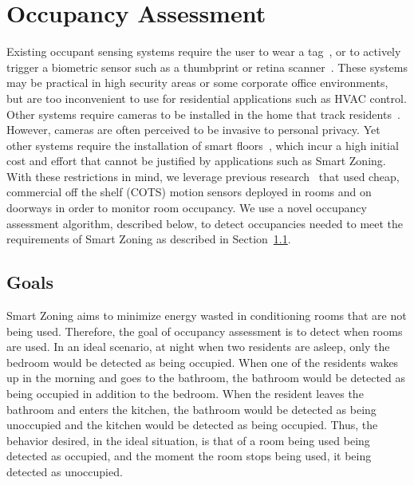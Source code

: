 \chapter{Occupancy Assessment}
\label{sec:occupancyAssessment}
Existing occupant sensing systems require the user to wear a
tag~\cite{smith2005rfid}, or to actively trigger a biometric sensor such as a
thumbprint or retina scanner~\cite{smith2005exploring}. These systems may be
practical in high security areas or some corporate office environments, but are
too inconvenient to use for residential applications such as HVAC control. Other
systems require cameras to be installed in the home that track
residents~\cite{nait4activity}. However, cameras are often perceived to be
invasive to personal privacy. Yet other systems require the installation of
smart floors~\cite{orr2000smart}, which incur a high initial cost and effort
that cannot be justified by applications such as Smart Zoning. With these
restrictions in mind, we leverage previous
research~\cite{srinivasan2008protecting,srinivasan2010using} that used cheap,
commercial off the shelf (COTS) motion sensors deployed in rooms and on doorways
in order to monitor room occupancy. We use a novel occupancy assessment
algorithm, described below, to detect occupancies needed to meet the
requirements of Smart Zoning as described in
Section~\ref{sec:occupancyAssessmentGoals}.

\section{Goals}
\label{sec:occupancyAssessmentGoals}



Smart Zoning aims to minimize energy wasted in conditioning rooms that are not
being used. Therefore, the goal of occupancy assessment is to detect when rooms
are used. In an ideal scenario, at night when two residents are asleep, only the
bedroom would be detected as being occupied. When one of the residents wakes up in
the morning and goes to the bathroom, the bathroom would be detected as being
occupied in addition to the bedroom. When the resident leaves the bathroom and
enters the kitchen, the bathroom would be detected as being unoccupied and the
kitchen would be detected as being occupied. Thus, the behavior desired, in the
ideal situation, is that of a room being used being detected as occupied, and
the moment the room stops being used, it being detected as unoccupied. 

